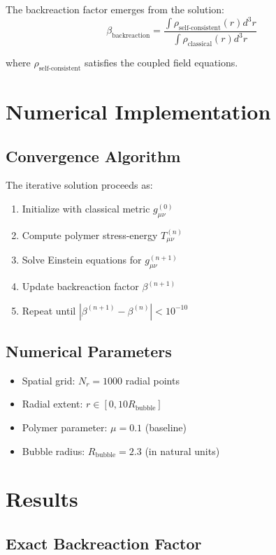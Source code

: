\documentclass[11pt,a4paper]{article}
\begin{document}
The backreaction factor emerges from the solution:
\begin{equation}
\beta_{\text{backreaction}} = \frac{\int \rho_{\text{self-consistent}}(r) d^3r}{\int \rho_{\text{classical}}(r) d^3r}
\end{equation}

where $\rho_{\text{self-consistent}}$ satisfies the coupled field equations.

\section{Numerical Implementation}

\subsection{Convergence Algorithm}

The iterative solution proceeds as:
\begin{enumerate}
\item Initialize with classical metric $g_{\mu\nu}^{(0)}$
\item Compute polymer stress-energy $T_{\mu\nu}^{(n)}$
\item Solve Einstein equations for $g_{\mu\nu}^{(n+1)}$
\item Update backreaction factor $\beta^{(n+1)}$
\item Repeat until $|\beta^{(n+1)} - \beta^{(n)}| < 10^{-10}$
\end{enumerate}

\subsection{Numerical Parameters}

\begin{itemize}
\item Spatial grid: $N_r = 1000$ radial points
\item Radial extent: $r \in [0, 10 R_{\text{bubble}}]$
\item Polymer parameter: $\mu = 0.1$ (baseline)
\item Bubble radius: $R_{\text{bubble}} = 2.3$ (in natural units)
\end{itemize}

\section{Results}

\subsection{Exact Backreaction Factor}
\end{document}
